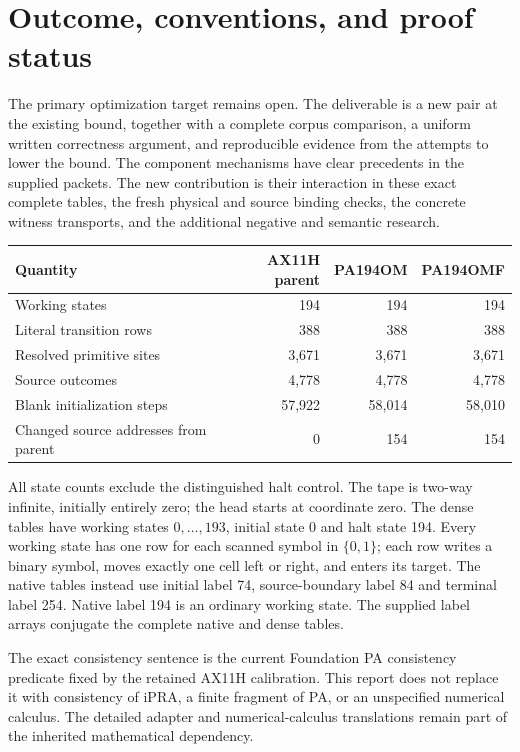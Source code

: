 \documentclass[11pt,a4paper]{article}
\begin{document}
\setcounter{tocdepth}{1}
\tableofcontents
\clearpage

\section{Outcome, conventions, and proof status}

The primary optimization target remains open. The deliverable is a new
pair at the existing bound, together with a complete corpus comparison,
a uniform written correctness argument, and reproducible evidence from
the attempts to lower the bound. The component mechanisms have clear
precedents in the supplied packets. The new contribution is their
interaction in these exact complete tables, the fresh physical and source
binding checks, the concrete witness transports, and the additional
negative and semantic research.

\begin{center}
\begin{tabular}{lrrr}
\toprule
Quantity & AX11H parent & PA194OM & PA194OMF\\\midrule
Working states &194&194&194\\
Literal transition rows &388&388&388\\
Resolved primitive sites &3,671&3,671&3,671\\
Source outcomes &4,778&4,778&4,778\\
Blank initialization steps &57,922&58,014&58,010\\
Changed source addresses from parent &0&154&154\\
\bottomrule
\end{tabular}
\end{center}

All state counts exclude the distinguished halt control. The tape is
two-way infinite, initially entirely zero; the head starts at coordinate
zero. The dense tables have working states $0,\ldots,193$, initial state
0 and halt state 194. Every working state has one row for each scanned
symbol in $\{0,1\}$; each row writes a binary symbol, moves exactly one
cell left or right, and enters its target. The native tables instead use
initial label 74, source-boundary label 84 and terminal label 254.
Native label 194 is an ordinary working state. The supplied label arrays
conjugate the complete native and dense tables.

The exact consistency sentence is the current Foundation PA consistency
predicate fixed by the retained AX11H calibration. This report does not
replace it with consistency of iPRA, a finite fragment of PA, or an
unspecified numerical calculus. The detailed adapter and numerical-calculus
translations remain part of the inherited mathematical dependency.
\end{document}
